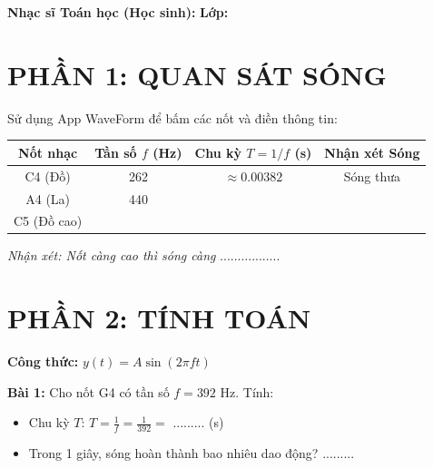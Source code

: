 \documentclass[12pt,a4paper]{article}
\begin{document}
\begin{center}
    \vspace{0.5cm}
\end{center}

\noindent \textbf{Nhạc sĩ Toán học (Học sinh):} \dotfill \textbf{Lớp:} \dotfill

\section*{\color{wavepurple} PHẦN 1: QUAN SÁT SÓNG}
Sử dụng App WaveForm để bấm các nốt và điền thông tin:

\begin{center}
\begin{tabular}{|c|c|c|c|}
\hline
\textbf{Nốt nhạc} & \textbf{Tần số $f$ (Hz)} & \textbf{Chu kỳ $T = 1/f$ (s)} & \textbf{Nhận xét Sóng} \\
\hline
C4 (Đồ) & 262 & $\approx 0.00382$ & Sóng thưa \\
\hline
A4 (La) & 440 & & \\
\hline
C5 (Đồ cao) & & & \\
\hline
\end{tabular}
\end{center}

\textit{Nhận xét: Nốt càng cao thì sóng càng} .................

\section*{\color{wavepurple} PHẦN 2: TÍNH TOÁN}
\textbf{Công thức:} $y(t) = A \sin(2\pi f t)$

\textbf{Bài 1:} Cho nốt G4 có tần số $f = 392$ Hz. Tính:
\begin{itemize}
    \item Chu kỳ $T$: $T = \frac{1}{f} = \frac{1}{392} = $ ......... (s)
    \item Trong 1 giây, sóng hoàn thành bao nhiêu dao động? .........
\end{itemize}
\end{document}
